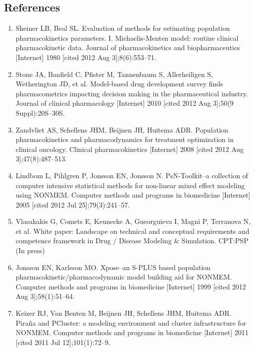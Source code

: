 \subsection*{References}
\scriptsize 
\begin{enumerate}
\item Sheiner LB, Beal SL. Evaluation of methods for estimating
  population pharmacokinetics parameters. I. Michaelis-Menten model:
  routine clinical pharmacokinetic data. Journal of pharmacokinetics
  and biopharmaceutics [Internet] 1980 [cited 2012 Aug 3];8(6):553–71.

\item Stone JA, Banfield C, Pfister M, Tannenbaum S, Allerheiligen S,
  Wetherington JD, et al. Model-based drug development survey finds
  pharmacometrics impacting decision making in the pharmaceutical
  industry. Journal of clinical pharmacology [Internet] 2010 [cited
  2012 Aug 3];50(9 Suppl):20S–30S.

\item Zandvliet AS, Schellens JHM, Beijnen JH, Huitema ADR. Population
  pharmacokinetics and pharmacodynamics for treatment optimization in
  clinical oncology. Clinical pharmacokinetics [Internet] 2008 [cited
  2012 Aug 3];47(8):487–513.

\item Lindbom L, Pihlgren P, Jonsson EN, Jonsson N. PsN-Toolkit--a
  collection of computer intensive statistical methods for non-linear
  mixed effect modeling using NONMEM. Computer methods and programs in
  biomedicine [Internet] 2005 [cited 2012 Jul 25];79(3):241–57.

\item Vlasakakis G, Comets E, Keunecke A, Gueorguieva I, Magni P,
  Terranova N, et al. White paper: Landscape on technical and
  conceptual requirements and competence framework in Drug / Disease
  Modeling \& Simulation. CPT:PSP (In press)

\item Jonsson EN, Karlsson MO. Xpose--an S-PLUS based population
  pharmacokinetic/pharmacodynamic model building aid for
  NONMEM. Computer methods and programs in biomedicine [Internet] 1999
  [cited 2012 Aug 3];58(1):51–64.

\item Keizer RJ, Van Benten M, Beijnen JH, Schellens JHM, Huitema
  ADR. Piraña and PCluster: a modeling environment and cluster
  infrastructure for NONMEM. Computer methods and programs in
  biomedicine [Internet] 2011 [cited 2011 Jul 12];101(1):72–9.


\end{enumerate}
